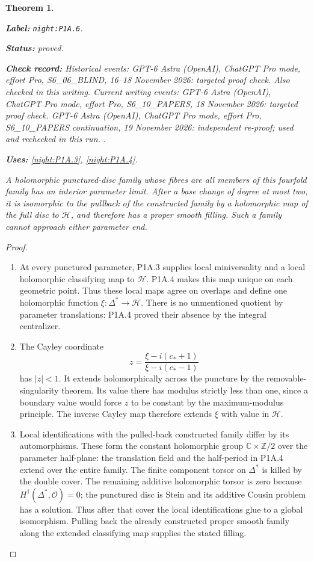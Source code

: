 \documentclass[11pt,a4paper]{article}
\newtheorem{theorem}{Theorem}[section]
\theoremstyle{definition}
\newcommand{\StatementRecord}[4]{\par\smallskip\begingroup\upshape\raggedright\noindent\textbf{Label:} \nolinkurl{#1}.\par\noindent\textbf{Status:} #2.\par\noindent\textbf{Check record:} #3.\par\noindent\textbf{Uses:} #4.\par\endgroup\smallskip}
\begin{document}
\begin{theorem}\label{night:P1A.6}
\StatementRecord{night:P1A.6}{proved}{Historical events: GPT-6 Astra (OpenAI), ChatGPT Pro mode, effort Pro, S6\_06\_BLIND, 16--18 November 2026: targeted proof check. Also checked in this writing. Current writing events: GPT-6 Astra (OpenAI), ChatGPT Pro mode, effort Pro, S6\_10\_PAPERS, 18 November 2026: targeted proof check. GPT-6 Astra (OpenAI), ChatGPT Pro mode, effort Pro, S6\_10\_PAPERS continuation, 19 November 2026: independent re-proof; used and rechecked in this run. }{\cref{night:P1A.3}, \cref{night:P1A.4}}
A holomorphic punctured-disc family whose fibres are all
members of this fourfold family has an interior parameter
limit. After a base change of degree at most two, it is
isomorphic to the pullback of the constructed family by
a holomorphic map of the full disc to $\mathcal H$, and
therefore has a proper smooth filling. Such a family
cannot approach either parameter end.
\end{theorem}
\begin{proof}
\begin{enumerate}[label=\arabic*.]
\item At every punctured parameter, P1A.3 supplies local
miniversality and a local holomorphic classifying map to
$\mathcal H$. P1A.4 makes this map unique on each geometric
point. Thus these local maps agree on overlaps and define
one holomorphic function $\xi:\Delta^*\to\mathcal H$.
There is no unmentioned quotient by parameter translations:
P1A.4 proved their absence by the integral centralizer.

\item The Cayley coordinate
\[
 z=\frac{\xi-i(c_*+1)}{\xi-i(c_*-1)}
\]
has $|z|<1$. It extends holomorphically across the puncture
by the removable-singularity theorem. Its value there has
modulus strictly less than one, since a boundary value
would force $z$ to be constant by the maximum-modulus
principle. The inverse Cayley map therefore extends
$\xi$ with value in $\mathcal H$.

\item Local identifications with the pulled-back constructed
family differ by its automorphisms. These form the constant
holomorphic group $\mathbb C\times\mathbb Z/2$ over the
parameter half-plane: the translation field and the
half-period in P1A.4 extend over the entire family.
The finite component torsor on $\Delta^*$ is killed by
the double cover. The remaining additive holomorphic
torsor is zero because $H^1(\Delta^*,\mathcal O)=0$;
the punctured disc is Stein and its additive Cousin
problem has a solution. Thus after that cover the local
identifications glue to a global isomorphism. Pulling
back the already constructed proper smooth family along
the extended classifying map supplies the stated filling.

\end{enumerate}
\end{proof}
\end{document}
